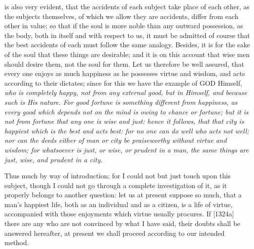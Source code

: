 is also very evident, that the accidents of each subject take place of
each other, as the subjects themselves, of which we allow they are
accidents, differ from each other in value; so that if the soul is more
noble than any outward possession, as the body, both in itself and with
respect to us, it must be admitted of course that the best accidents of
each must follow the same analogy. Besides, it is for the sake of the soul
that these things are desirable; and it is on this account that wise men
should desire them, not the soul for them. Let us therefore be well
assured, that every one enjoys as much happiness as he possesses virtue
and wisdom, and acts according to their dictates; since for this we have
the example of GOD Himself, \emph{who is completely happy, not from any
external good, but in Himself, and because such is His nature\emph{. For good
fortune is something different from happiness, as every good which depends
not on the mind is owing to chance or fortune; but it is not from fortune
that any one is wise and just: hence it follows, that that city is
happiest which is the best and acts best: for no one can do well who acts
not well; nor can the deeds either of man or city be praiseworthy without
virtue and wisdom; for whatsoever is just, or wise, or prudent in a man,
the same things are just, wise, and prudent in a city. }}

Thus much by way of introduction; for I could not but just touch upon this
subject, though I could not go through a complete investigation of it, as
it properly belongs to another question: let us at present suppose so
much, that a man's happiest life, both as an individual and as a citizen,
is a life of virtue, accompanied with those enjoyments which virtue
usually procures. If [1324a] there are any who are not convinced by what I
have said, their doubts shall be answered hereafter, at present we shall
proceed according to our intended method.


